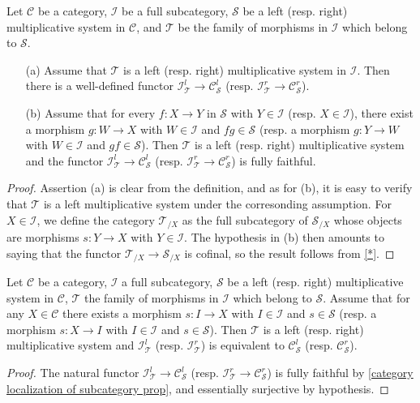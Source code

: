 \begin{proposition}\label{category localization of subcategory prop}
Let $\mathcal{C}$ be a category, $\mathcal{I}$ be a full subcategory, $\mathcal{S}$ be a left (resp. right) multiplicative system in $\mathcal{C}$, and $\mathcal{T}$ be the family of morphisms in $\mathcal{I}$ which belong to $\mathcal{S}$.
\begin{enumerate}
    \item[(a)] Assume that $\mathcal{T}$ is a left (resp. right) multiplicative system in $\mathcal{I}$. Then there is a well-defined functor $\mathcal{I}^l_\mathcal{T}\to\mathcal{C}^l_\mathcal{S}$ (resp. $\mathcal{I}^r_\mathcal{T}\to\mathcal{C}^r_\mathcal{S}$).
    \item[(b)] Assume that for every $f:X\to Y$ in $\mathcal{S}$ with $Y\in\mathcal{I}$ (resp. $X\in\mathcal{I}$), there exist a morphism $g:W\to X$ with $W\in\mathcal{I}$ and $fg\in\mathcal{S}$ (resp. a morphism $g:Y\to W$ with $W\in\mathcal{I}$ and $gf\in\mathcal{S}$). Then $\mathcal{T}$ is a left (resp. right) multiplicative system and the functor $\mathcal{I}^l_\mathcal{T}\to\mathcal{C}^l_\mathcal{S}$ (resp. $\mathcal{I}^r_\mathcal{T}\to\mathcal{C}^r_\mathcal{S}$) is fully faithful.
\end{enumerate}
\end{proposition}
\begin{proof}
Assertion (a) is clear from the definition, and as for (b), it is easy to verify that $\mathcal{T}$ is a left multiplicative system under the corresonding assumption. For $X\in\mathcal{I}$, we define the category $\mathcal{T}_{/X}$ as the full subcategory of $\mathcal{S}_{/X}$ whose objects are morphisms $s:Y\to X$ with $Y\in\mathcal{I}$. The hypothesis in (b) then amounts to saying that the functor $\mathcal{T}_{/X}\to\mathcal{S}_{/X}$ is cofinal, so the result follows from \cref{*}.
\end{proof}

\begin{corollary}\label{category localization of subcategory equivalent if}
Let $\mathcal{C}$ be a category, $\mathcal{I}$ a full subcategory, $\mathcal{S}$ be a left (resp. right) multiplicative system in $\mathcal{C}$, $\mathcal{T}$ the family of morphisms in $\mathcal{I}$ which belong to $\mathcal{S}$. Assume that for any $X\in\mathcal{C}$ there exists a morphism $s:I\to X$ with $I\in\mathcal{I}$ and $s\in\mathcal{S}$ (resp. a morphism $s:X\to I$ with $I\in\mathcal{I}$ and $s\in\mathcal{S}$). Then $\mathcal{T}$ is a left (resp. right) multiplicative system and $\mathcal{I}_\mathcal{T}^l$ (resp. $\mathcal{I}_\mathcal{T}^r$) is equivalent to $\mathcal{C}_\mathcal{S}^l$ (resp. $\mathcal{C}_\mathcal{S}^r$).
\end{corollary}
\begin{proof}
The natural functor $\mathcal{I}^l_\mathcal{T}\to\mathcal{C}^l_\mathcal{S}$ (resp. $\mathcal{I}^r_\mathcal{T}\to\mathcal{C}^r_\mathcal{S}$) is fully faithful by \cref{category localization of subcategory prop}, and essentially surjective by hypothesis.
\end{proof}

